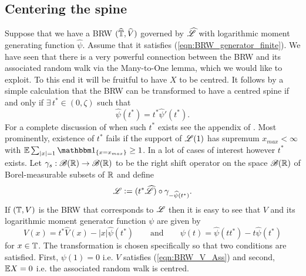 \subsection{Centering the spine}
Suppose that we have a BRW $(\widehat{\mathbb{T}}, \widehat{V})$ governed by $\widehat{\mathscr{L}}$ with logarithmic moment generating function $\widehat{\psi}$. Assume that it satisfies (\ref{eqn:BRW_generator_finite}). We have seen that there is a very powerful connection between the BRW and its associated random walk via the Many-to-One lemma, which we would like to exploit. To this end it will be fruitful to have $X$ to be centred. It follows by a simple calculation that the BRW can be transformed to have a centred spine if and only if $\exists\, t^* \in (0, \zeta)$ such that
\begin{equation}\label{eqn:t*exists}
\widehat{\psi} (t^*) = t^* \widehat{\psi}'(t^*). 
\end{equation}
For a complete discussion of when such $t^*$ exists see the appendix of \cite{jaffuel2227critical}. Most prominently, existence of $t^*$ fails if the support of $\mathscr{L}(1)$ has supremum $x_{max} < \infty$ with $\E \sum_{|x|=1} \Ind_{\{ x = x_{max}\}} \geq 1$. In a lot of cases of interest however $t^*$ exists. Let $\gamma_s : \mathscr{B}(\mathbb{R}) \to \mathscr{B}(\mathbb{R})$ to be the right shift operator on the space $\mathscr{B}(\mathbb{R})$ of Borel-measurable subsets of $\mathbb{R}$ and define
\begin{equation}\label{eqn:transformation}
\mathscr{L} \vcentcolon= (t^* \widehat{\mathscr{L}}) \circ \gamma_{- \widehat{\psi}(t^*)}. 
\end{equation}
If $(\mathbb{T}, V)$ is the BRW that corresponds to $\mathscr{L}$ then it is easy to see that $V$ and its logarithmic moment generator function $\psi$ are given by 
\begin{equation}\label{eqn:transformation2}
V(x) = t^* \widehat{V}(x) - |x| \widehat{\psi}(t^*) \qquad\text{and}\qquad \psi(t) = \widehat{\psi}(t t^*) -t \widehat{\psi}(t^*) 
\end{equation}
for $x \in \mathbb{T}$. The transformation is chosen specifically so that two conditions are satisfied. First, $\psi(1) = 0$ i.e. $V$ satisfies (\ref{eqn:BRW_V_Ass}) and second, $\mathbb{E} X = 0$ i.e. the associated random walk is centred.







